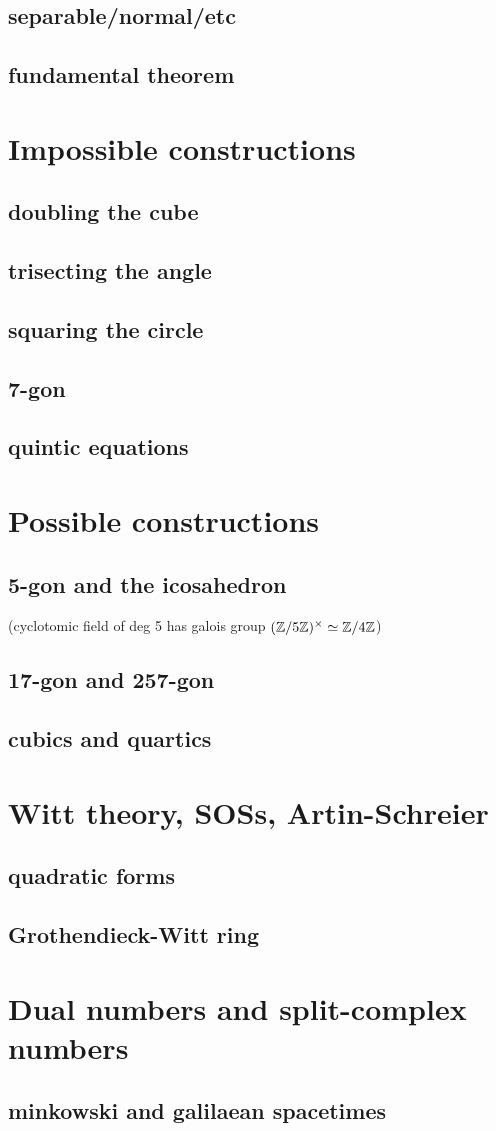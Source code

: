 \documentclass[a4,12pt]{amsbook}
\begin{document}
\section{separable/normal/etc}
\section{fundamental theorem}
\chapter{Impossible constructions}
\section{doubling the cube}
\section{trisecting the angle}
\section{squaring the circle}
\section{7-gon}
\section{quintic equations}
\chapter{Possible constructions}
\section{5-gon and the icosahedron}
(cyclotomic field of deg 5 has galois group $(\mathbb{Z}/5\mathbb{Z})^\times \simeq \mathbb{Z}/4\mathbb{Z}$)
\section{17-gon and 257-gon}
\section{cubics and quartics}
\chapter{Witt theory, SOSs, Artin-Schreier}
\section{quadratic forms}
\section{Grothendieck-Witt ring}
\chapter{Dual numbers and split-complex numbers}
\section{minkowski and galilaean spacetimes}


\end{document}
